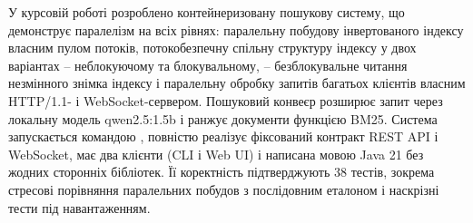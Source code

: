 
У курсовій роботі розроблено контейнеризовану пошукову систему, що демонструє паралелізм на
всіх рівнях: паралельну побудову інвертованого індексу власним пулом потоків, потокобезпечну
спільну структуру індексу у двох варіантах -- неблокуючому та блокувальному, -- безблокувальне
читання незмінного знімка індексу і паралельну обробку запитів багатьох клієнтів власним
HTTP/1.1- і WebSocket-сервером. Пошуковий конвеєр розширює запит через локальну модель
qwen2.5:1.5b і ранжує документи функцією BM25. Система запускається командою
, повністю реалізує фіксований контракт REST API і WebSocket, має два
клієнти (CLI і Web UI) і написана мовою Java 21 без жодних сторонніх бібліотек. Її
коректність підтверджують 38 тестів, зокрема стресові порівняння паралельних побудов з
послідовним еталоном і наскрізні тести під навантаженням.

